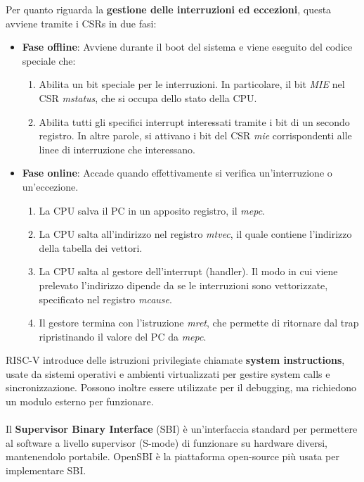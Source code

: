 Per quanto riguarda la \textbf{gestione delle interruzioni ed eccezioni}, questa avviene tramite i CSRs in due fasi:
\begin{itemize}
	\item \textbf{Fase offline}: Avviene durante il boot del sistema e viene eseguito del codice speciale che: 
	\begin{enumerate}
		\item Abilita un bit speciale per le interruzioni. In particolare, il bit \textit{MIE} nel CSR \textit{mstatus}, che si occupa dello stato della CPU.
		\item Abilita tutti gli specifici interrupt interessati tramite i bit di un secondo registro. In altre parole, si attivano i bit del CSR \textit{mie} corrispondenti alle linee di interruzione che interessano.
	\end{enumerate}
	\item \textbf{Fase online}: Accade quando effettivamente si verifica un'interruzione o un’eccezione.
	\begin{enumerate}
		\item La CPU salva il PC in un apposito registro, il \textit{mepc}.
		\item La CPU salta all’indirizzo nel registro \textit{mtvec}, il quale contiene l’indirizzo della tabella dei vettori.
		\item La CPU salta al gestore dell’interrupt (handler). Il modo in cui viene prelevato l'indirizzo dipende da se le interruzioni sono vettorizzate, specificato nel registro \textit{mcause}.
		\item Il gestore termina con l’istruzione \textit{mret}, che permette di ritornare dal trap 
		ripristinando il valore del PC da \textit{mepc}.
	\end{enumerate}
\end{itemize}
RISC-V introduce delle istruzioni privilegiate chiamate \textbf{system instructions}, usate da sistemi operativi e ambienti virtualizzati per gestire system calls e sincronizzazione. Possono inoltre essere utilizzate per il debugging, ma richiedono un modulo esterno per funzionare.
\\
\\
Il \textbf{Supervisor Binary Interface} (SBI) è un'interfaccia standard per permettere al software a livello supervisor (S-mode) di funzionare su hardware diversi, mantenendolo portabile. OpenSBI è la piattaforma open-source più usata per implementare SBI.

